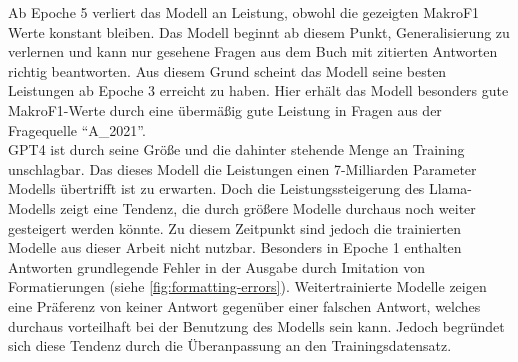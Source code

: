 Ab Epoche 5 verliert das Modell an Leistung, obwohl die gezeigten MakroF1 Werte konstant bleiben.
Das Modell beginnt ab diesem Punkt, Generalisierung zu verlernen und kann nur gesehene Fragen aus dem Buch mit zitierten Antworten richtig beantworten.
Aus diesem Grund scheint das Modell seine besten Leistungen ab Epoche 3 erreicht zu haben.
Hier erhält das Modell besonders gute MakroF1-Werte
durch eine übermäßig gute Leistung in Fragen aus der Fragequelle \enquote{A\_2021}.\\

GPT4 ist durch seine Größe und die dahinter stehende Menge an Training unschlagbar.
Das dieses Modell die Leistungen einen 7-Milliarden Parameter Modells übertrifft ist zu erwarten.
Doch die Leistungssteigerung des Llama-Modells zeigt eine Tendenz, die durch größere Modelle durchaus noch weiter gesteigert werden könnte.
Zu diesem Zeitpunkt sind jedoch die trainierten Modelle aus dieser Arbeit nicht nutzbar.
Besonders in Epoche 1 enthalten Antworten grundlegende Fehler in der Ausgabe durch Imitation von Formatierungen (siehe \cref{fig:formatting-errors}).
Weitertrainierte Modelle zeigen eine Präferenz von keiner Antwort gegenüber einer falschen Antwort,
welches durchaus vorteilhaft bei der Benutzung des Modells sein kann.
Jedoch begründet sich diese Tendenz durch die Überanpassung an den Trainingsdatensatz.\\


